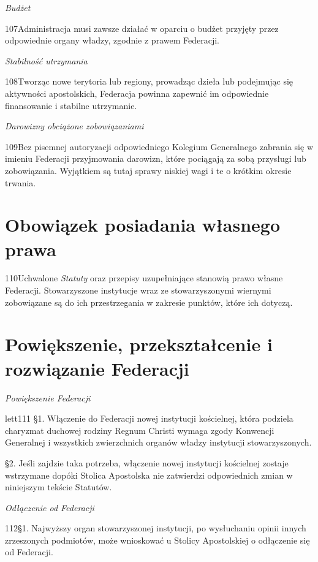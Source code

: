﻿\documentclass{book}
\newcommand{\lett}[1]{\lettrine[findent=6pt]{#1}}
\newcommand{\ssec}[1]{\vspace{1em}\textit{#1}\vspace{.5em}\nopagebreak}
\begin{document}
\ssec{Budżet}


\lett{107} Administracja musi zawsze działać w oparciu o budżet przyjęty przez odpowiednie organy władzy, zgodnie z prawem Federacji.
 
\ssec{Stabilność utrzymania}


\lett{108} Tworząc nowe terytoria lub regiony, prowadząc dzieła lub podejmując się aktywności apostolskich, Federacja powinna zapewnić im odpowiednie finansowanie i stabilne utrzymanie.
 
\ssec{Darowizny obciążone zobowiązaniami}


\lett{109} Bez pisemnej autoryzacji odpowiedniego Kolegium Generalnego zabrania się w imieniu Federacji przyjmowania darowizn, które pociągają za sobą przysługi lub zobowiązania. Wyjątkiem są tutaj sprawy niskiej wagi i te o krótkim okresie trwania.
 
\chapter{Obowiązek posiadania własnego prawa}


\lett{110} Uchwalone {\em Statuty} oraz przepisy uzupełniające stanowią prawo własne Federacji. Stowarzyszone instytucje wraz ze stowarzyszonymi wiernymi zobowiązane są do ich przestrzegania w zakresie punktów, które ich dotyczą.


\chapter{Powiększenie, przekształcenie i rozwiązanie Federacji}


\ssec{Powiększenie Federacji}


lett{111} \S{}1. Włączenie do Federacji nowej instytucji kościelnej, która podziela charyzmat duchowej rodziny Regnum Christi wymaga zgody Konwencji Generalnej i wszystkich zwierzchnich organów władzy instytucji stowarzyszonych.


\S{}2. Jeśli zajdzie taka potrzeba, włączenie nowej instytucji kościelnej zostaje wstrzymane dopóki Stolica Apostolska nie zatwierdzi odpowiednich zmian w niniejszym tekście Statutów.




\ssec{Odłączenie od Federacji}


\lett{112} \S{}1. Najwyższy organ stowarzyszonej instytucji, po wysłuchaniu opinii innych zrzeszonych podmiotów, może wnioskować u Stolicy Apostolskiej o odłączenie się od Federacji.
\end{document}

